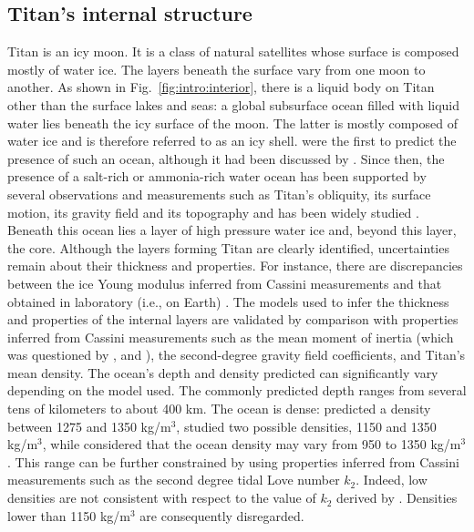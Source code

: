 \subsection{Titan's internal structure}
\label{sec:intro:depth}
Titan is an icy moon. It is a class of natural satellites whose surface is composed mostly of water ice. The layers beneath the surface vary from one moon to another. As shown in Fig.~\ref{fig:intro:interior}, there is a liquid body on Titan other than the surface lakes and seas: a global subsurface ocean filled with liquid water lies beneath the icy surface of the moon. The latter is mostly composed of water ice and is therefore referred to as an icy shell.
\cite{lunine1987clathrate} were the first to predict the presence of such an ocean, although it had been discussed by \cite{consolmagno1978evolution}. Since then, the presence of a salt-rich or ammonia-rich water ocean has been supported by several observations and measurements such as Titan's obliquity, its surface motion, its gravity field and its topography \citep{rappaport2008can,nimmo2010shell, iess2012tides, hemingway2013rigid, lefevre2014structure, baland2011titan, baland2014titan} and has been widely studied \citep[see, e.g.,][]{beuthe2008thin, beuthe2015tides, beuthe2015tidal, fortes2012titan, sohl1995tidal, sohl2003interior, sohl2014structural}. Beneath this ocean lies a layer of high pressure water ice and, beyond this layer, the core. Although the layers forming Titan are clearly identified, uncertainties remain about their thickness and properties. For instance, there are discrepancies between the ice Young modulus inferred from Cassini measurements and that obtained in laboratory (i.e., on Earth) \citep{nimmo2004what}. The models used to infer the thickness and properties of the internal layers are validated by comparison with properties inferred from Cassini measurements such as the mean moment of inertia (which was questioned by \citet{hemingway2013rigid}, \citet{baland2014titan} and \citet{lefevre2014structure}), the second-degree gravity field coefficients, and Titan's mean density. The ocean's depth and density predicted can significantly vary depending on the model used. The commonly predicted depth ranges from several tens of kilometers to about 400 km. The ocean is dense: \citet{baland2014titan} predicted a density between 1275 and 1350 kg/m$^3$, \citet{sohl2014structural} studied two possible densities, 1150 and 1350 kg/m$^3$, while \citet{coyette2018variations} considered that the ocean density may vary from 950 to 1350 kg/m$^3$. This range can be further constrained by using properties inferred from Cassini measurements such as the second degree tidal Love number $k_2$. Indeed, low densities are not consistent with respect to the value of $k_2$ derived by \cite{iess2012tides}. Densities lower than 1150 kg/m$^3$ are consequently disregarded.

